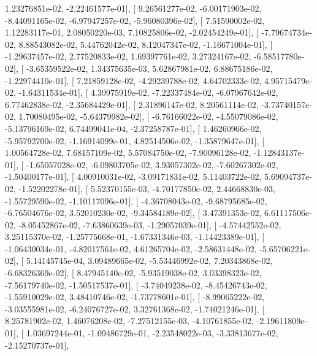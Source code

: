 \documentclass{article}
\begin{document}
          1.23276851e-02,  -2.22461577e-01],
       [  9.26561277e-02,  -6.00171903e-02,  -8.44091165e-02,
         -6.97947257e-02,  -5.96080396e-02],
       [  7.51590002e-02,   1.12283117e-01,   2.08050220e-03,
          7.10825806e-02,  -2.02454249e-01],
       [ -7.79674734e-02,   8.88543082e-02,   5.44762042e-02,
          8.12047347e-02,  -1.16671004e-01],
       [ -1.29637457e-02,   2.77520833e-02,   1.69397761e-02,
          3.27324167e-02,  -6.58517780e-02],
       [ -3.65359522e-02,   1.34375635e-03,   5.62867981e-02,
          6.88675186e-02,  -1.22974410e-01],
       [  7.21859128e-02,  -4.29239788e-02,   4.64702333e-02,
          4.95715479e-02,  -1.64311534e-01],
       [  4.39975919e-02,  -7.22337484e-02,  -6.07967642e-02,
          6.77462838e-02,  -2.35684429e-01],
       [  2.31896147e-02,   8.20561114e-02,  -3.73740157e-02,
          1.70080495e-02,  -5.64379982e-02],
       [ -6.76166022e-02,  -4.55079086e-02,  -5.13796169e-02,
          6.74499041e-04,  -2.37258787e-01],
       [  1.46260966e-02,  -5.95792700e-02,  -1.16914099e-01,
          4.82514506e-02,  -1.35879647e-01],
       [  1.00564728e-02,   7.68157109e-02,   5.57084750e-02,
         -7.90096128e-02,  -1.12843137e-01],
       [ -1.65057028e-02,  -6.09803705e-02,   3.93057302e-02,
         -7.60267302e-02,  -1.50400177e-01],
       [  4.00910031e-02,  -3.09171831e-02,   5.11403722e-02,
          5.69094737e-02,  -1.52202278e-01],
       [  5.52370155e-03,  -4.70177850e-02,   2.44668830e-03,
         -1.55729590e-02,  -1.10117096e-01],
       [ -4.36708043e-02,  -9.68795685e-02,  -6.76504676e-02,
          3.52010230e-02,  -9.34584189e-02],
       [  3.47391353e-02,   6.61117506e-02,  -8.05452867e-02,
         -7.63860639e-03,  -1.29057039e-01],
       [ -4.57442552e-02,   3.25115370e-02,  -1.25775668e-01,
         -1.67331346e-03,  -1.14423389e-01],
       [ -1.06430034e-01,  -4.82017561e-02,   4.61265704e-02,
         -2.58631448e-02,  -5.65706221e-02],
       [  5.14145745e-04,   3.09489665e-02,  -5.53446992e-02,
          7.20343868e-02,  -6.68326369e-02],
       [  8.47945140e-02,  -5.93519038e-02,   3.03398323e-02,
         -7.56179740e-02,  -1.50517537e-01],
       [ -3.74049238e-02,  -8.45426743e-02,  -1.55910029e-02,
          3.48410746e-02,  -1.73778601e-01],
       [ -8.99065222e-02,  -3.03555981e-02,  -6.24076727e-02,
          3.32761368e-02,  -1.74021246e-01],
       [  8.25781902e-02,   1.46076208e-02,  -7.27512155e-03,
         -4.10761855e-02,  -2.19611809e-01],
       [  1.03697244e-01,  -1.09486729e-01,  -2.23548022e-03,
         -3.33813677e-02,  -2.15270737e-01],
\end{document}
